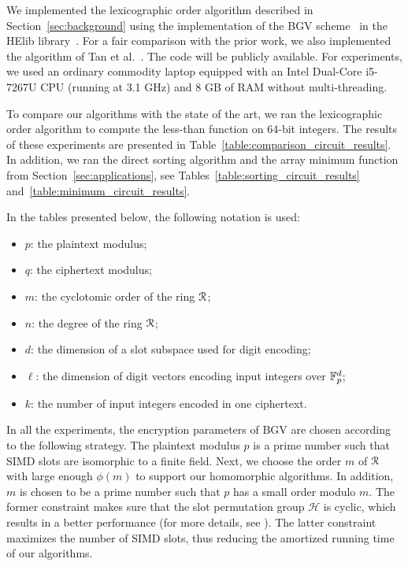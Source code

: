 We implemented the lexicographic order algorithm described in Section~\ref{sec:background} using the implementation of the BGV scheme~\cite{BGV12} in the HElib library~\cite{HElib}.
For a fair comparison with the prior work, we also implemented the algorithm of Tan et al.~\cite{TLWRK20}.
The code will be publicly available.
For experiments, we used an ordinary commodity laptop equipped with an Intel Dual-Core i5-7267U CPU (running at 3.1 GHz) and 8 GB of RAM without multi-threading.

To compare our algorithms with the state of the art, we ran the lexicographic order algorithm to compute the less-than function on 64-bit integers.
The results of these experiments are presented in Table~\ref{table:comparison_circuit_results}.
In addition, we ran the direct sorting algorithm and the array minimum function from Section~\ref{sec:applications}, see Tables~\ref{table:sorting_circuit_results} and~\ref{table:minimum_circuit_results}.

In the tables presented below, the following notation is used:
\begin{itemize}
  \item $p$: the plaintext modulus;
  \item $q$: the ciphertext modulus;
  \item $m$: the cyclotomic order of the ring $\mathcal{R}$;
  \item $n$: the degree of the ring $\mathcal{R}$;
  \item $d$: the dimension of a slot subspace used for digit encoding;
  \item $\ell$: the dimension of digit vectors encoding input integers over $\mathbb{F}_p^d$;
  \item $k$: the number of input integers encoded in one ciphertext.
\end{itemize}

In all the experiments, the encryption parameters of BGV are chosen according to the following strategy.
The plaintext modulus $p$ is a prime number such that SIMD slots are isomorphic to a finite field.
Next, we choose the order $m$ of $\mathcal{R}$ with large enough $\phi(m)$ to support our homomorphic algorithms.
In addition, $m$ is chosen to be a prime number such that $p$ has a small order modulo $m$.
The former constraint makes sure that the slot permutation group $\mathcal{H}$ is cyclic, which results in a better performance (for more details, see \cite[Appendix C.3]{GHS12}).
The latter constraint maximizes the number of SIMD slots, thus reducing the amortized running time of our algorithms.

